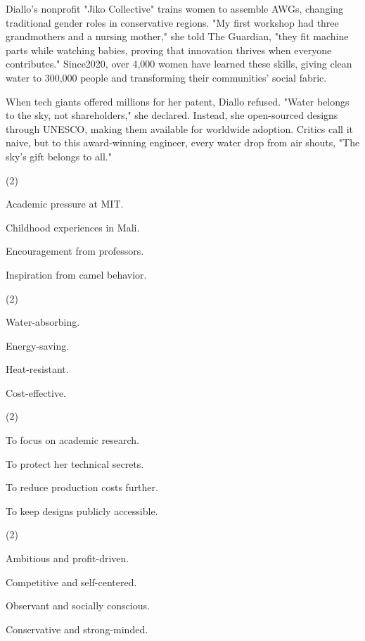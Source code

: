 \documentclass{英语试卷}
\begin{document}
\par Diallo's nonprofit "Jiko Collective" trains women to assemble AWGs, changing traditional gender roles in conservative regions. "My first workshop had three grandmothers and a nursing mother," she told The Guardian, "they fit machine parts while watching babies, proving that innovation thrives when everyone contributes." Since2020, over 4,000 women have learned these skills, giving clean water to 300,000 people and transforming their communities' social fabric.\par
\par When tech giants offered millions for her patent, Diallo refused. "Water belongs to the sky, not shareholders," she declared. Instead, she open-sourced designs through UNESCO, making them available for worldwide adoption. Critics call it naive, but to this award-winning engineer, every water drop from air shouts, "The sky's gift belongs to all."\par
{}
\begin{choices}(2)
  \item Academic pressure at MIT.
  \item Childhood experiences in Mali.
  \item Encouragement from professors.
  \item Inspiration from camel behavior.
\end{choices}
\begin{choices}(2)
  \item Water-absorbing.
  \item Energy-saving.
  \item Heat-resistant.
  \item Cost-effective.
\end{choices}
\begin{choices}(2)
  \item To focus on academic research.
  \item To protect her technical secrets.
  \item To reduce production costs further.
  \item To keep designs publicly accessible.
\end{choices}
\begin{choices}(2)
  \item Ambitious and profit-driven.
  \item Competitive and self-centered.
  \item Observant and socially conscious.
  \item Conservative and strong-minded.
\end{choices}
\end{document}

